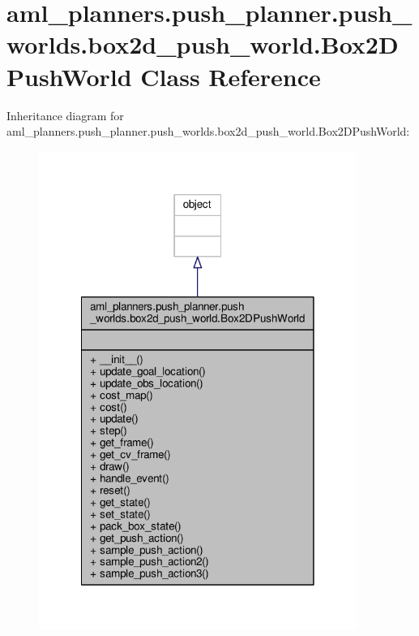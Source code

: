 \hypertarget{classaml__planners_1_1push__planner_1_1push__worlds_1_1box2d__push__world_1_1_box2_d_push_world}{\section{aml\-\_\-planners.\-push\-\_\-planner.\-push\-\_\-worlds.\-box2d\-\_\-push\-\_\-world.\-Box2\-D\-Push\-World Class Reference}
\label{classaml__planners_1_1push__planner_1_1push__worlds_1_1box2d__push__world_1_1_box2_d_push_world}
}


Inheritance diagram for aml\-\_\-planners.\-push\-\_\-planner.\-push\-\_\-worlds.\-box2d\-\_\-push\-\_\-world.\-Box2\-D\-Push\-World\-:\nopagebreak
\begin{figure}[H]
\begin{center}
\leavevmode
\includegraphics[width=294pt]{classaml__planners_1_1push__planner_1_1push__worlds_1_1box2d__push__world_1_1_box2_d_push_world__inherit__graph}
\end{center}
\end{figure}



